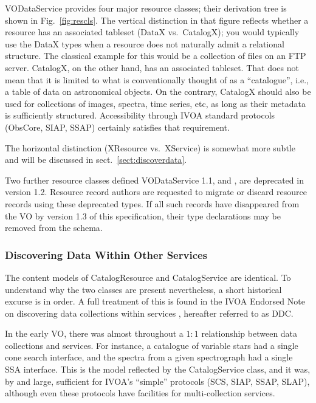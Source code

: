 \documentclass[11pt,a4paper]{ivoa}
\begin{document}
VODataService provides four major resource classes; their derivation
tree is shown in Fig.~\ref{fig:rescls}.  The vertical distinction in
that figure reflects whether a resource has an associated tableset
(DataX vs.~CatalogX); you would typically use the DataX types when a
resource does not naturally admit a relational structure.  The classical
example for this would be a collection of files on an FTP server.  CatalogX,
on the other hand, has an associated tableset.  That does not mean that
it is limited to what is conventionally thought of as a ``catalogue'',
i.e., a table of data on astronomical objects.  On the
contrary, CatalogX should also be used for collections of images,
spectra, time series, etc, as long as their metadata is sufficiently
structured.  Accessibility through IVOA standard protocols (ObsCore,
SIAP, SSAP) certainly satisfies that requirement.

The horizontal distinction (XResource vs.~XService) is somewhat more
subtle and will be discussed in sect.~\ref{sect:discoverdata}.

Two further resource classes defined VODataService 1.1,
 and , 
are deprecated in version 1.2.  
Resource record authors are requested to migrate or discard resource
records using these deprecated types.  If all such records have
disappeared from the VO by version 1.3 of this specification, their
type declarations may be removed from the schema.

\subsubsection{Discovering Data Within Other Services}

The content models of CatalogResource and CatalogService are identical.
To understand why the two classes are present nevertheless, a short
historical excurse is in order.  A full treatment of this is found in
the IVOA Endorsed Note on discovering data collections within services
\citep{2019ivoa.rept.0520D}, hereafter referred to as DDC.

In the early VO, there was almost throughout a $1:1$ relationship between
data collections and services.  For instance, a catalogue of variable
stars had a single cone search interface, and the spectra from a given
spectrograph had a single SSA interface.  This is the model reflected by
the CatalogService class, and it was, by and large, sufficient for
IVOA's ``simple'' protocols (SCS, SIAP, SSAP, SLAP), although even these
protocols have facilities for multi-collection services.
\end{document}
